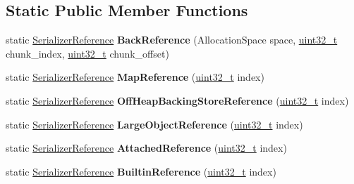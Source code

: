 \subsection*{Static Public Member Functions}
\begin{DoxyCompactItemize}
\item 
\mbox{\label{classv8_1_1internal_1_1SerializerReference_a9e26ccd3183bcbf06da7beb0d197dd99}} 
static \mbox{\hyperlink{classv8_1_1internal_1_1SerializerReference}{Serializer\+Reference}} {\bfseries Back\+Reference} (Allocation\+Space space, \mbox{\hyperlink{classuint32__t}{uint32\+\_\+t}} chunk\+\_\+index, \mbox{\hyperlink{classuint32__t}{uint32\+\_\+t}} chunk\+\_\+offset)
\item 
\mbox{\label{classv8_1_1internal_1_1SerializerReference_a9246196f3a2d5f63915670b54eab7464}} 
static \mbox{\hyperlink{classv8_1_1internal_1_1SerializerReference}{Serializer\+Reference}} {\bfseries Map\+Reference} (\mbox{\hyperlink{classuint32__t}{uint32\+\_\+t}} index)
\item 
\mbox{\label{classv8_1_1internal_1_1SerializerReference_a3bf331bda9d66a88c90d3486e6aa0059}} 
static \mbox{\hyperlink{classv8_1_1internal_1_1SerializerReference}{Serializer\+Reference}} {\bfseries Off\+Heap\+Backing\+Store\+Reference} (\mbox{\hyperlink{classuint32__t}{uint32\+\_\+t}} index)
\item 
\mbox{\label{classv8_1_1internal_1_1SerializerReference_ad7c1962875b08ea5943e6568ce6e5077}} 
static \mbox{\hyperlink{classv8_1_1internal_1_1SerializerReference}{Serializer\+Reference}} {\bfseries Large\+Object\+Reference} (\mbox{\hyperlink{classuint32__t}{uint32\+\_\+t}} index)
\item 
\mbox{\label{classv8_1_1internal_1_1SerializerReference_ad8e90ceed38c49ed83aa2b4e6e0dd9df}} 
static \mbox{\hyperlink{classv8_1_1internal_1_1SerializerReference}{Serializer\+Reference}} {\bfseries Attached\+Reference} (\mbox{\hyperlink{classuint32__t}{uint32\+\_\+t}} index)
\item 
\mbox{\label{classv8_1_1internal_1_1SerializerReference_a46d2f4ee452aec5076b00096b850037d}} 
static \mbox{\hyperlink{classv8_1_1internal_1_1SerializerReference}{Serializer\+Reference}} {\bfseries Builtin\+Reference} (\mbox{\hyperlink{classuint32__t}{uint32\+\_\+t}} index)
\end{DoxyCompactItemize}
